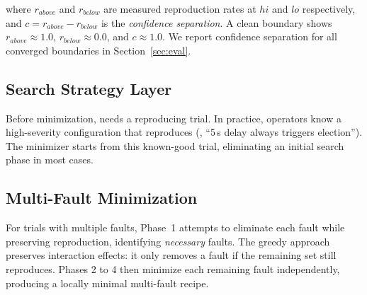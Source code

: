 \noindent where $r_{above}$ and $r_{below}$ are measured reproduction rates at
$hi$ and $lo$ respectively, and $c = r_{above} - r_{below}$ is the
\emph{confidence separation}. A clean boundary shows $r_{above} \approx 1.0$,
$r_{below} \approx 0.0$, and $c \approx 1.0$. We report confidence separation
for all converged boundaries in Section~\ref{sec:eval}.

\subsection{Search Strategy Layer}
\label{sec:search}

Before minimization, \system{} needs a reproducing trial. In practice,
operators know a high-severity configuration that reproduces
(\eg{}, ``5\,s delay always triggers election''). The minimizer starts from
this known-good trial, eliminating an initial search phase in most cases.

\subsection{Multi-Fault Minimization}
\label{sec:multi-fault}

For trials with multiple faults, Phase~1 attempts to eliminate each fault
while preserving reproduction, identifying \emph{necessary} faults. The
greedy approach preserves interaction effects: it only removes a fault if the
remaining set still reproduces. Phases 2 to 4 then minimize each remaining
fault independently, producing a locally minimal multi-fault recipe.
